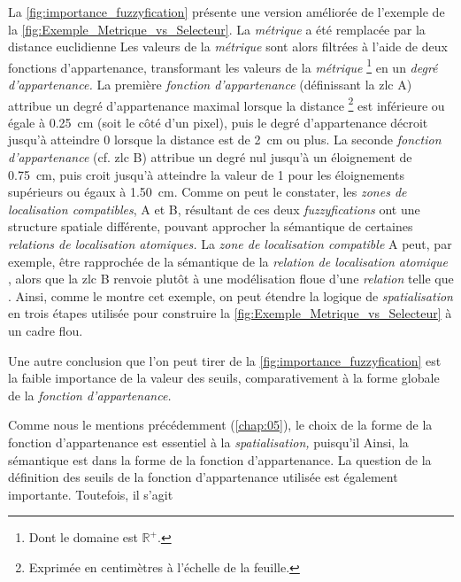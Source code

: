 La \autoref{fig:importance_fuzzyfication} présente une version améliorée de l'exemple de la \autoref{fig:Exemple_Metrique_vs_Selecteur}. La \emph{métrique} a été remplacée par la distance euclidienne
%
Les valeurs de la \emph{métrique} sont alors filtrées à l'aide de deux fonctions d'appartenance, transformant les valeurs de la \emph{métrique} \footnote{Dont le domaine est \(\mathbb{R}^+\).} en un \emph{degré d'appartenance.} La première \emph{fonction d'appartenance} (définissant la \ac{zlc} \textcolor{RdBu-9-1}{\textsf{A}}) attribue un degré d'appartenance maximal lorsque la distance \footnote{Exprimée en centimètres à l'échelle de la feuille.} est inférieure ou égale à \SI{0,25}{\centi\meter} (soit le côté d'un pixel), puis le degré d'appartenance décroit jusqu'à atteindre 0 lorsque la distance est de \SI{2}{\centi\meter} ou plus. La seconde \emph{fonction d'appartenance} (cf. \ac{zlc} \textcolor{RdBu-9-9}{\textsf{B}}) attribue un degré nul jusqu'à un éloignement de \SI{0,75}{\centi\meter}, puis croit jusqu'à atteindre la valeur de 1 pour les éloignements supérieurs ou égaux à \SI{1,50}{\centi\meter}. Comme on peut le constater, les \emph{zones de localisation compatibles}, \textcolor{RdBu-9-1}{\textsf{A}} et \textcolor{RdBu-9-9}{\textsf{B}}, résultant de ces deux \emph{fuzzyfications} ont une structure spatiale différente, pouvant approcher la sémantique de certaines \emph{relations de localisation atomiques.} La \emph{zone de localisation compatible} \textcolor{RdBu-9-1}{\textsf{A}} peut, par exemple, être rapprochée de la sémantique de la \emph{relation de localisation atomique} , alors que la \ac{zlc} \textcolor{RdBu-9-9}{\textsf{B}} renvoie plutôt à une modélisation floue d'une \emph{relation} telle que .
%
Ainsi, comme le montre cet exemple, on peut étendre la logique de \emph{spatialisation} en trois étapes utilisée pour construire la \autoref{fig:Exemple_Metrique_vs_Selecteur} à un cadre flou.

Une autre conclusion que l'on peut tirer de la \autoref{fig:importance_fuzzyfication} est la faible importance de la valeur des seuils, comparativement à la forme globale de la \emph{fonction d'appartenance.}



Comme nous le mentions précédemment (\autoref{chap:05}), le choix de la forme de la fonction d'appartenance est essentiel à la \emph{spatialisation,} puisqu'il
%
Ainsi, la sémantique est dans la forme de la fonction d'appartenance.
%
La question de la définition des seuils de la fonction d'appartenance utilisée est également importante. Toutefois, il s'agit 

